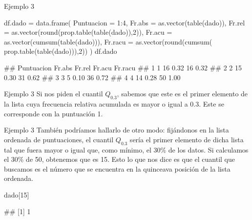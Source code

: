 \documentclass[
  ignorenonframetext,
  aspectratio=169]{beamer}
\newenvironment{Shaded}{\begin{snugshade}}{\end{snugshade}}
\newcommand{\AttributeTok}[1]{\textcolor[rgb]{0.77,0.63,0.00}{#1}}
\newcommand{\DecValTok}[1]{\textcolor[rgb]{0.00,0.00,0.81}{#1}}
\newcommand{\FunctionTok}[1]{\textcolor[rgb]{0.00,0.00,0.00}{#1}}
\newcommand{\NormalTok}[1]{#1}
\newcommand{\OtherTok}[1]{\textcolor[rgb]{0.56,0.35,0.01}{#1}}
\newcommand{\SpecialCharTok}[1]{\textcolor[rgb]{0.00,0.00,0.00}{#1}}
\let\oldverbatim\verbatim
\let\endoldverbatim\endverbatim
\renewenvironment{verbatim}{\tiny\oldverbatim}{\endoldverbatim}
\begin{document}
\begin{frame}[fragile]{Ejemplo 3}
\protect\hypertarget{ejemplo-3-6}{}
\begin{Shaded}
\begin{Highlighting}[]
\NormalTok{df.dado }\OtherTok{=} \FunctionTok{data.frame}\NormalTok{(}
  \AttributeTok{Puntuacion =} \DecValTok{1}\SpecialCharTok{:}\DecValTok{4}\NormalTok{,}
  \AttributeTok{Fr.abs =} \FunctionTok{as.vector}\NormalTok{(}\FunctionTok{table}\NormalTok{(dado)),}
  \AttributeTok{Fr.rel =} \FunctionTok{as.vector}\NormalTok{(}\FunctionTok{round}\NormalTok{(}\FunctionTok{prop.table}\NormalTok{(}\FunctionTok{table}\NormalTok{(dado)),}\DecValTok{2}\NormalTok{)),}
  \AttributeTok{Fr.acu =} \FunctionTok{as.vector}\NormalTok{(}\FunctionTok{cumsum}\NormalTok{(}\FunctionTok{table}\NormalTok{(dado))),}
  \AttributeTok{Fr.racu =} \FunctionTok{as.vector}\NormalTok{(}\FunctionTok{round}\NormalTok{(}\FunctionTok{cumsum}\NormalTok{(}
    \FunctionTok{prop.table}\NormalTok{(}\FunctionTok{table}\NormalTok{(dado))),}\DecValTok{2}\NormalTok{))}
\NormalTok{  )}
\NormalTok{df.dado}
\end{Highlighting}
\end{Shaded}

\begin{verbatim}
##   Puntuacion Fr.abs Fr.rel Fr.acu Fr.racu
## 1          1     16   0.32     16    0.32
## 2          2     15   0.30     31    0.62
## 3          3      5   0.10     36    0.72
## 4          4     14   0.28     50    1.00
\end{verbatim}
\end{frame}

\begin{frame}{Ejemplo 3}
\protect\hypertarget{ejemplo-3-7}{}
Si nos piden el cuantil \(Q_{0.3}\), sabemos que este es el primer
elemento de la lista cuya frecuencia relativa acumulada es mayor o igual
a 0.3. Este se corresponde con la puntuación 1.
\end{frame}

\begin{frame}[fragile]{Ejemplo 3}
\protect\hypertarget{ejemplo-3-8}{}
También podríamos hallarlo de otro modo: fijándonos en la lista ordenada
de puntuaciones, el cuantil \(Q_{0.3}\) sería el primer elemento de
dicha lista tal que fuera mayor o igual que, como mínimo, el 30\% de los
datos. Si calculamos el 30\% de 50, obtenemos que es 15. Esto lo que nos
dice es que el cuantil que buscamos es el número que se encuentra en la
quinceava posición de la lista ordenada.

\begin{Shaded}
\begin{Highlighting}[]
\NormalTok{dado[}\DecValTok{15}\NormalTok{]}
\end{Highlighting}
\end{Shaded}

\begin{verbatim}
## [1] 1
\end{verbatim}
\end{frame}
\end{document}
